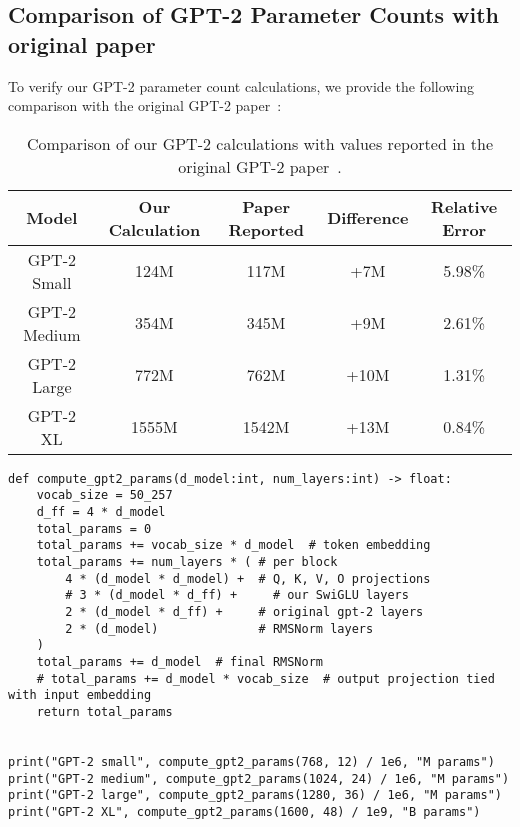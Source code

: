 \subsection{Comparison of GPT-2 Parameter Counts with original paper}
\label{appendix:gpt2-param-comparison}

To verify our GPT-2 parameter count calculations, we provide the following comparison with the original GPT-2 paper~\cite{radford2019language}:

\begin{table}[h]
    \centering
    \caption{Comparison of our GPT-2 calculations with values reported in the original GPT-2 paper~\cite{radford2019language}.}
    \label{tab:gpt2-param-comparison}
    \begin{tabular}{c|c|c|c|c}
        \toprule
        Model & Our Calculation & Paper Reported & Difference & Relative Error \\
        \midrule
        GPT-2 Small & 124M & 117M & +7M & 5.98\% \\
        GPT-2 Medium & 354M & 345M & +9M & 2.61\% \\
        GPT-2 Large & 772M & 762M & +10M & 1.31\% \\
        GPT-2 XL & 1555M & 1542M & +13M & 0.84\% \\
        \bottomrule
    \end{tabular}
\end{table}

\begin{lstlisting}
def compute_gpt2_params(d_model:int, num_layers:int) -> float:
    vocab_size = 50_257
    d_ff = 4 * d_model
    total_params = 0
    total_params += vocab_size * d_model  # token embedding
    total_params += num_layers * ( # per block
        4 * (d_model * d_model) +  # Q, K, V, O projections
        # 3 * (d_model * d_ff) +     # our SwiGLU layers
        2 * (d_model * d_ff) +     # original gpt-2 layers
        2 * (d_model)              # RMSNorm layers
    )
    total_params += d_model  # final RMSNorm
    # total_params += d_model * vocab_size  # output projection tied with input embedding
    return total_params


print("GPT-2 small", compute_gpt2_params(768, 12) / 1e6, "M params")
print("GPT-2 medium", compute_gpt2_params(1024, 24) / 1e6, "M params")
print("GPT-2 large", compute_gpt2_params(1280, 36) / 1e6, "M params")
print("GPT-2 XL", compute_gpt2_params(1600, 48) / 1e9, "B params")
\end{lstlisting}

